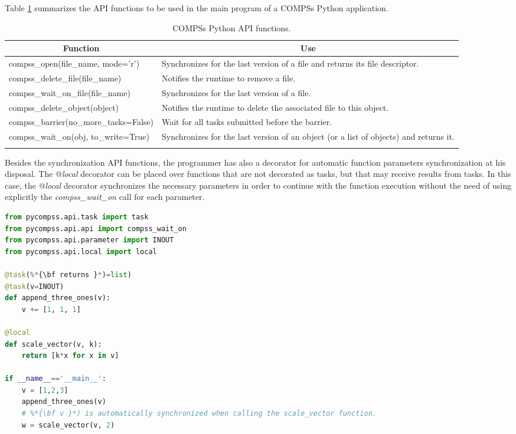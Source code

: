 Table \ref{tab:python_api_functions} summarizes the API functions to be used in the main program of a COMPSs Python application.
\bgroup
  \def\arraystretch{1.5}%
  \begin{longtable}{| p{} | p{} |}
    \hline
    \multicolumn{1}{|c|}{{\bf Function }}    &  \multicolumn{1}{c|}{{\bf Use }}\\
    \hline
    compss\_open(file\_name, mode='r') & Synchronizes for the last version of a file and returns its file descriptor. \\
    \hline
    compss\_delete\_file(file\_name) & Notifies the runtime to remove a file. \\
    \hline
    compss\_wait\_on\_file(file\_name) & Synchronizes for the last version of a file. \\
    \hline
    compss\_delete\_object(object) & Notifies the runtime to delete the associated file to this object. \\
    \hline
    compss\_barrier(no\_more\_tasks=False) & Wait for all tasks submitted before the barrier. \\
    \hline
    compss\_wait\_on(obj, to\_write=True) & Synchronizes for the last version of an object (or a list of objects) and returns it. \\
    \hline
    \caption{COMPSs Python API functions.}
    \label{tab:python_api_functions}
  \end{longtable}
\egroup

Besides the synchronization API functions, the programmer has also a decorator for automatic function parameters synchronization 
at his disposal. The {\it $@$local} decorator can be placed over functions that are not decorated as tasks, but that may receive 
results from tasks. In this case, the {\it $@$local} decorator synchronizes the necessary parameters in order to continue with 
the function execution without the need of using explicitly the {\it compss\_wait\_on} call for each parameter.

\begin{lstlisting}[language=python]
from pycompss.api.task import task
from pycompss.api.api import compss_wait_on
from pycompss.api.parameter import INOUT
from pycompss.api.local import local

@task(%*{\bf returns }*)=list)
@task(v=INOUT)
def append_three_ones(v):
    v += [1, 1, 1]

@local
def scale_vector(v, k):
    return [k*x for x in v]

if __name__=='__main__':
    v = [1,2,3]
    append_three_ones(v)
    # %*{\bf v }*) is automatically synchronized when calling the scale_vector function.
    w = scale_vector(v, 2)

\end{lstlisting}


